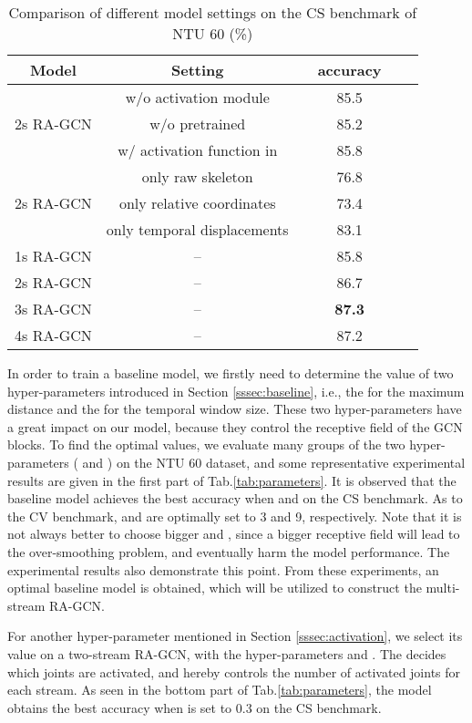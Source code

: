 \documentclass[journal]{IEEEtran}
\begin{document}
\begin{table}[t]
\caption{Comparison of different model settings on the CS benchmark of NTU 60 (\%)}
\label{tab:ablation}
\centering
\begin{tabular}{cccccc}
\hline
Model & Setting & & accuracy \\
\hline
& w/o activation module &  & 85.5 \\
2s RA-GCN & w/o pretrained &  & 85.2 \\
& w/ activation function in \cite{song2019richly} &  & 85.8 \\
\hline
& only raw skeleton &  & 76.8 \\
2s RA-GCN & only relative coordinates &  & 73.4 \\
& only temporal displacements &  & 83.1 \\
\hline
1s RA-GCN & -- &  & 85.8 \\
2s RA-GCN & -- &  & 86.7 \\
3s RA-GCN & -- &  & {\bf 87.3} \\
4s RA-GCN & -- &  & 87.2 \\
\hline
\end{tabular}
\vspace{-0.4cm}
\end{table}

In order to train a baseline model, we firstly need to determine the value of two hyper-parameters introduced in Section \ref{sssec:baseline}, i.e., the  for the maximum distance and the  for the temporal window size. These two hyper-parameters have a great impact on our model, because they control the receptive field of the GCN blocks. To find the optimal values, we evaluate many groups of the two hyper-parameters ( and ) on the NTU 60 dataset, and some representative experimental results are given in the first part of Tab.\ref{tab:parameters}. It is observed that the baseline model achieves the best accuracy when  and  on the CS benchmark. As to the CV benchmark,  and  are optimally set to 3 and 9, respectively. Note that it is not always better to choose bigger  and , since a bigger receptive field will lead to the over-smoothing problem, and eventually harm the model performance. The experimental results also demonstrate this point. From these experiments, an optimal baseline model is obtained, which will be utilized to construct the multi-stream RA-GCN.

For another hyper-parameter  mentioned in Section \ref{sssec:activation}, we select its value on a two-stream RA-GCN, with the hyper-parameters  and . The  decides which joints are activated, and hereby controls the number of activated joints for each stream. As seen in the bottom part of Tab.\ref{tab:parameters}, the model obtains the best accuracy when  is set to 0.3 on the CS benchmark.
\end{document}

